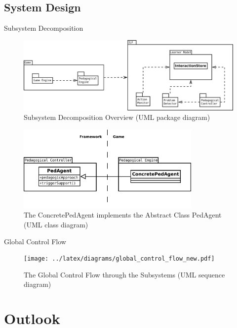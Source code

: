\documentclass[compress]{beamer}
\begin{document}
\subsection{System Design}

\begin{frame}[allowframebreaks]{Subsystem Decomposition}
\begin{figure}
    \centering
    \includegraphics[width=1.05\textwidth]{diagrams/subsystem_decomposition_new.pdf}
    \caption{Subsystem Decomposition Overview (UML package diagram)}
\end{figure}

\begin{figure}
    \centering
    \includegraphics[width=0.8\textwidth]{diagrams/pedagent_concrete.pdf}
    \caption{The ConcretePedAgent implements the Abstract Class PedAgent (UML class diagram)}
\end{figure}
\end{frame}

\begin{frame}{Global Control Flow}
\begin{figure}
    \centering
    \texttt{[image: ../latex/diagrams/global\_control\_flow\_new.pdf]}
    \caption{The Global Control Flow through the Subsystems (UML sequence diagram)}
\end{figure}
\end{frame}

\section{Outlook}
\end{document}
